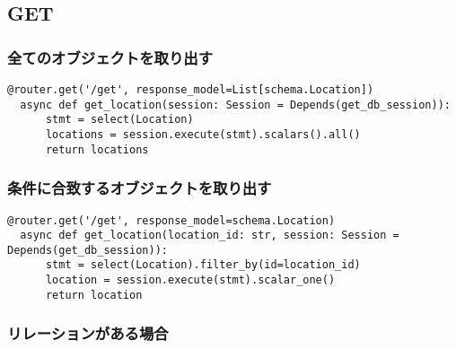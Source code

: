 \subsection{GET}

\subsubsection*{全てのオブジェクトを取り出す}

\begin{lstlisting}[caption=Get Location List]
  @router.get('/get', response_model=List[schema.Location])
  async def get_location(session: Session = Depends(get_db_session)):
      stmt = select(Location)
      locations = session.execute(stmt).scalars().all()
      return locations
  \end{lstlisting}
  

\subsubsection*{条件に合致するオブジェクトを取り出す}

\begin{lstlisting}[caption=Get Location on condition]
  @router.get('/get', response_model=schema.Location)
  async def get_location(location_id: str, session: Session = Depends(get_db_session)):
      stmt = select(Location).filter_by(id=location_id)
      location = session.execute(stmt).scalar_one()
      return location
\end{lstlisting}

\subsubsection*{リレーションがある場合}

